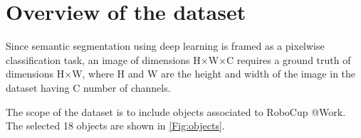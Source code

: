 \documentclass[paper=a4,11pt,parskip=half,toc=listof]{scrartcl}
\begin{document}


\newpage
\setcounter{page}{3} 
\begin{spacing}{1.14}
\tableofcontents
\end{spacing}

\clearpage{}
\listoftables %
\clearpage{}
\listoffigures %
\clearpage{}
\clearpage{}

\setcounter{tocdepth}{4} 
\setcounter{secnumdepth}{4}
\setlength\parindent{0pt}  %



\newpage
\section{Overview of the dataset}
Since semantic segmentation using deep learning is framed as a pixelwise classification task, an image of dimensions H$\times$W$\times$C requires a ground truth of dimensions H$\times$W, where H and W are the height and width of the image in the dataset having C number of channels. 

The scope of the dataset is to include objects associated to RoboCup @Work. The selected 18 objects are shown in \ref{Fig:objects}.
\end{document}
